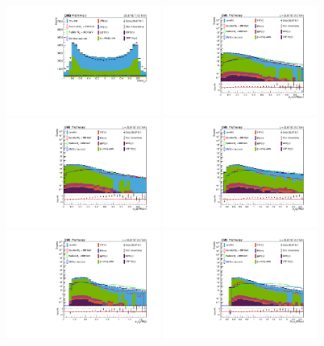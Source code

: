 \begin{figure}[thb]
  \centering
\includegraphics[width=0.45\textwidth]{figures/sec-control/NP_CosTheta_gg.pdf}\hfil
\includegraphics[width=0.45\textwidth]{figures/sec-control/LOG_ggptmjjgg.pdf}\hfil
\includegraphics[width=0.45\textwidth]{figures/sec-control/LOG_jjptmjjgg.pdf}\hfil
\includegraphics[width=0.45\textwidth]{figures/sec-control/LOG_ljetptmgg}\hfil
\includegraphics[width=0.45\textwidth]{figures/sec-control/LOG_sjetptmgg}\hfil
\includegraphics[width=0.45\textwidth]{figures/sec-control/LOG_lphoptmgg}\hfil


\end{figure}
